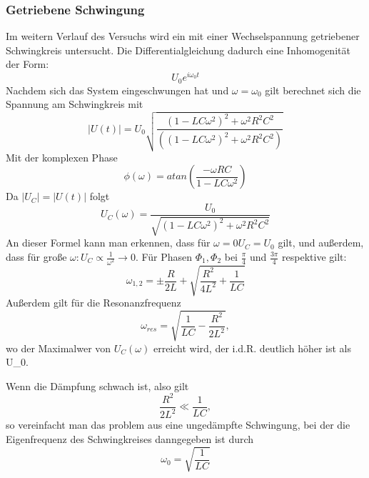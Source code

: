 \documentclass{scrartcl}
\begin{document}
        \subsubsection{Getriebene Schwingung}
        \label{subs:Getriebene Schwingung}
        Im weitern Verlauf des Versuchs wird ein mit einer Wechselspannung getriebener Schwingkreis
        untersucht. Die Differentialgleichung dadurch eine Inhomogenität der Form:
        \begin{equation*}
            U_0e^{i\omega_0 t}
        \end{equation*}
        Nachdem sich das System eingeschwungen hat und $\omega = \omega_0$ gilt
        berechnet sich die Spannung am Schwingkreis mit
        \begin{equation}
            |U(t)| = U_0\sqrt{\frac{(1-LC\omega^2)^2+\omega^2R^2C^2}{((1-LC\omega^2)^2+\omega^2R^2C^2)}}
        \end{equation}
        Mit der komplexen Phase
        \begin{equation}
            \label{eqn:Phase}
            \phi(\omega) = atan\left(\frac{-\omega RC}{1-LC\omega^2}\right)
        \end{equation}
        Da $|U_C|=|U(t)|$ folgt
        \begin{equation}
            U_C(\omega)=\frac{U_0}{\sqrt{(1-LC\omega^2)^2+\omega^2R^2C^2}}
        \end{equation}
        An dieser Formel kann man erkennen, dass für $\omega = 0 U_C = U_0$ gilt,
        und außerdem, dass für große $\omega : U_C \propto \frac{1}{\omega^2} \rightarrow 0.$
        Für Phasen $\Phi_1,\Phi_2$ bei  $\frac{\pi}{4}$ und $\frac{3\pi}{4}$ respektive
        gilt:
        \begin{equation}
            \label{eqn:Spektrum}
            \omega_{1,2}=\pm \frac{R}{2L}+\sqrt{\frac{R^2}{4L^2}+\frac{1}{LC}}
        \end{equation}
        Außerdem gilt für die Resonanzfrequenz
        \begin{equation}
            \label{eqn:ResFrequenz}
            \omega_{res} = \sqrt{\frac{1}{LC}-\frac{R^2}{2L^2}},
        \end{equation}
        wo der Maximalwer von $U_C(\omega)$ erreicht wird, der i.d.R. deutlich höher ist als U_0.

         Wenn die Dämpfung schwach ist, also gilt
         \begin{equation*}
             \frac{R^2}{2L^2}\ll \frac{1}{LC},
         \end{equation*}
         so vereinfacht man das problem aus eine ungedämpfte Schwingung, bei der die Eigenfrequenz des Schwingkreises danngegeben ist durch
         \begin{equation}
             \omega_0 = \sqrt{\frac{1}{LC}}
         \end{equation}
\end{document}
